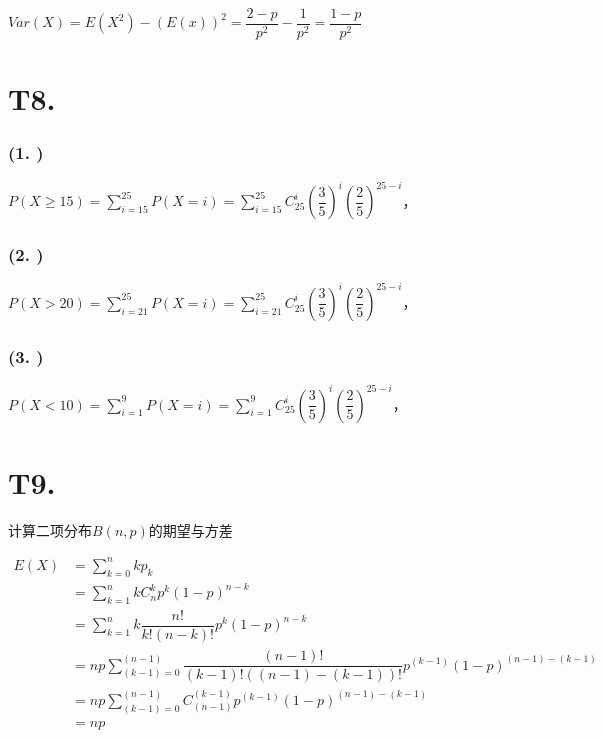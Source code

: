 \documentclass{article}
\newcommand\df[2]{\dfrac{#1}{#2}}
\begin{document}
$Var(X)=E(X^2)-(E(x))^2=\df{2-p}{p^2}-\df{1}{p^2}=\df{1-p}{p^2}$

\section*{T8. }

\subsubsection*{(1. )}

$P(X\geq15)=\sum_{i=15}^{25}P(X=i)=\sum_{i=15}^{25}C_{25}^i(\df{3}{5})^i(\df{2}{5})^{25-i}$，

\subsubsection*{(2. )}

$P(X>20)=\sum_{i=21}^{25}P(X=i)=\sum_{i=21}^{25}C_{25}^i(\df{3}{5})^i(\df{2}{5})^{25-i}$，

\subsubsection*{(3. )}

$P(X<10)=\sum_{i=1}^{9}P(X=i)=\sum_{i=1}^{9}C_{25}^i(\df{3}{5})^i(\df{2}{5})^{25-i}$，

\section*{T9. }

计算二项分布$B(n,p)$的期望与方差

\begin{equation}
    \begin{aligned}
        E(X)
        & = \sum_{k=0}^{n}kp_k\\
        & = \sum_{k=1}^{n}kC_n^kp^k(1-p)^{n-k}\\
        & = \sum_{k=1}^{n}k\df{n!}{k!(n-k)!}p^k(1-p)^{n-k}\\
        & = np\sum_{(k-1)=0}^{(n-1)}\df{(n-1)!}{(k-1)!((n-1)-(k-1))!}p^{(k-1)}(1-p)^{(n-1)-(k-1)}\\
        & = np\sum_{(k-1)=0}^{(n-1)}C_{(n-1)}^{(k-1)}p^{(k-1)}(1-p)^{(n-1)-(k-1)}\\
        & = np
    \end{aligned}
\end{equation}
\end{document}
